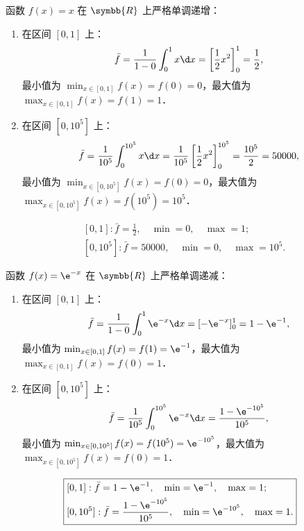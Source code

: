 \begin{solution}

    函数 $f(x) = x$ 在 $\symbb{R}$ 上严格单调递增：
    \begin{enumerate}
        \item 在区间 $[0, 1]$ 上：
              \begin{equation}
                  \bar{f} = \frac{1}{1 - 0}\int_0^1 x \d x = \left[ \frac{1}{2}x^2 \right]_0^1 = \frac{1}{2},
              \end{equation}
              最小值为 $\min_{x\in [0, 1]} f(x) = f(0) = 0$，最大值为 $\max_{x\in [0, 1]} f(x) = f(1) = 1$．
        \item 在区间 $[0, 10^5]$ 上：
              \begin{equation}
                  \bar{f} = \frac{1}{10^5}\int_0^{10^5} x \d x = \frac{1}{10^5} \left[ \frac{1}{2}x^2 \right]_0^{10^5} = \frac{10^5}{2} = 50000,
              \end{equation}
              最小值为 $\min_{x\in [0, 10^5]} f(x) = f(0) = 0$，最大值为 $\max_{x\in [0, 10^5]} f(x) = f(10^5) = 10^5$．
    \end{enumerate}
    \begin{equation}
        \boxed{\begin{aligned}
                 & [0, 1]: \bar{f} = \frac{1}{2}, \quad \min = 0, \quad \max = 1; \\
                 & [0, 10^5]: \bar{f} = 50000, \quad \min = 0, \quad \max = 10^5.
            \end{aligned}}
    \end{equation}


    函数 $f(x) = \e^{-x}$ 在 $\symbb{R}$ 上严格单调递减：
    \begin{enumerate}
        \item 在区间 $[0, 1]$ 上：
              \begin{equation}
                  \bar{f} = \frac{1}{1 - 0}\int_0^1 \e^{-x} \d x = [-\e^{-x}]_0^1 = 1 - \e^{-1},
              \end{equation}
              最小值为 $\min_{x\in [0, 1]} f(x) = f(1) = \e^{-1}$，最大值为 $\max_{x\in [0, 1]} f(x) = f(0) = 1$．
        \item 在区间 $[0, 10^5]$ 上：
              \begin{equation}
                  \bar{f} = \frac{1}{10^5}\int_0^{10^5} \e^{-x} \d x = \frac{1 - \e^{-10^5}}{10^5},
              \end{equation}
              最小值为 $\min_{x\in [0, 10^5]} f(x) = f(10^5) = \e^{-10^5}$，最大值为 $\max_{x\in [0, 10^5]} f(x) = f(0) = 1$．
    \end{enumerate}
    \begin{equation}
        \boxed{\begin{aligned}
                 & [0, 1]: \bar{f} = 1 - \e^{-1}, \quad \min = \e^{-1}, \quad \max = 1;                       \\
                 & [0, 10^5]: \bar{f} = \frac{1 - \e^{-10^5}}{10^5}, \quad \min = \e^{-10^5}, \quad \max = 1.
            \end{aligned}}
    \end{equation}


\end{solution}
